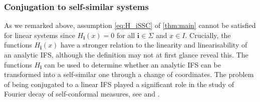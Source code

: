 \documentclass[11pt,]{article}
\def\cref#1{\ref{#1}}%
\theoremstyle{definition}
\theoremstyle{remark}
\newcommand{\0}{\mathbf{0}}
\newcommand{\bi}{\mathbf{i}}
\numberwithin{equation}{section}
\begin{document}
%
%
%
%



\subsubsection{Conjugation to self-similar systems}\label{sec:ConjLinSys}
As we remarked above, assumption \eqref{eq:H_iSSC} of \cref{thm:main} cannot be satisfied for linear
systems since $H_{\bi}(x)=0$ for all $\bi\in \Sigma$ and $x \in I$.  Crucially, the functions
$H_{\bi}(x)$ have a stronger relation to the linearity and linearisability of an analytic IFS,
although the definition may not at first glance reveal this.  The functions $H_{\bi}$ can be used to
determine whether an analytic IFS can be transformed into a
self-similar one through a change of coordinates.
The problem of being conjugated to a linear IFS played a significant role in the study of Fourier
decay of self-conformal measures, see
\cite{AlgomEtal_LogFourierDecaySelfConf_JLMS,BakerBanaji_PolyFourierDecay} and \cite[Corollary 1.2 part
3.]{AlgomEtal_PointwiseNormalityFDecaySelfSonf_AdvMath21}.
\end{document}

